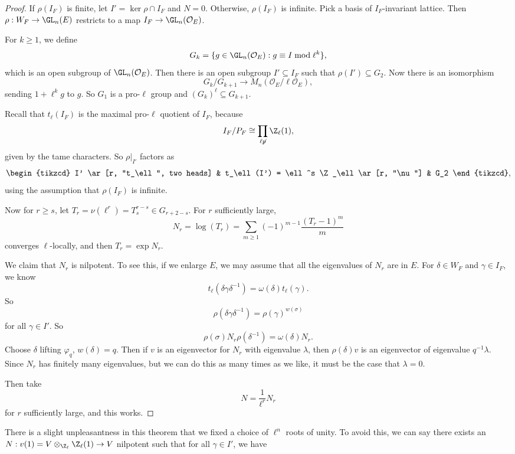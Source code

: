 \documentclass[a4paper]{article}
\begin{document}
\begin{proof}
  If $\rho(I_F)$ is finite, let $I' = \ker \rho \cap I_F$ and $N = 0$. Otherwise, $\rho(I_F)$ is infinite. Pick a basis of $I_F$-invariant lattice. Then $\rho: W_F \to \GL_n(E)$ restricts to a map $I_F \to \GL_n(\mathcal{O}_E)$.

  For $k \geq 1$, we define
  \[
    G_k = \{g \in \GL_n(\mathcal{O}_E)  : g \equiv I \bmod \ell^k \},
  \]
  which is an open subgroup of $\GL_n(\mathcal{O}_E)$. Then there is an open subgroup $I' \subseteq I_F$ such that $\rho(I') \subseteq G_2$. Now there is an isomorphism
  \[
    G_k/G_{k + 1} \to M_n(\mathcal{O}_E/\ell \mathcal{O}_E),
  \]
  sending $1 + \ell^k g$ to $g$. So $G_1$ is a pro-$\ell$ group and $(G_k)^\ell \subseteq G_{k + 1}$.

  Recall that $t_\ell(I_F)$ is the maximal pro-$\ell$ quotient of $I_F$, because
  \[
    I_F/P_F \cong \prod_{\ell \not p} \Z_\ell(1),
  \]
  given by the tame characters. So $\rho|_{I'}$ factors as
  \[
    \begin{tikzcd}
      I' \ar[r, "t_\ell", two heads] & t_\ell(I') = \ell^s \Z_\ell \ar[r, "\nu"] & G_2
    \end{tikzcd},
  \]
  using the assumption that $\rho(I_F)$ is infinite.

  Now for $r \geq s$, let $T_r = \nu(\ell^r) = T_s^{r - s} \in G_{r + 2  - s}$. For $r$ sufficiently large, 
  \[
    N_r = \log (T_r) = \sum_{m \geq 1} (-1)^{m - 1} \frac{(T_r - 1)^m}{m}
  \]
  converges $\ell$-locally, and then $T_r = \exp N_r$.

  We claim that $N_r$ is nilpotent. To see this, if we enlarge $E$, we may assume that all the eigenvalues of $N_r$ are in $E$. For $\delta \in W_F$ and $\gamma \in I_F$, we know
  \[
    t_\ell(\delta \gamma \delta^{-1}) = \omega(\delta) t_\ell(\gamma).
  \]
  So
  \[
    \rho(\delta \gamma \delta^{-1}) = \rho(\gamma)^{w(\sigma)}
  \]
  for all $\gamma \in I'$. So
  \[
    \rho(\sigma) N_r \rho(\delta^{-1}) = \omega(\delta) N_r.
  \]
  Choose $\delta$ lifting $\varphi_q$, $w(\delta) = q$. Then if $v$ is an eigenvector for $N_r$ with eigenvalue $\lambda$, then $\rho(\delta)v$ is an eigenvector of eigenvalue $q^{-1}\lambda$. Since $N_r$ has finitely many eigenvalues, but we can do this as many times as we like, it must be the case that $\lambda = 0$.

  Then take
  \[
    N = \frac{1}{\ell^r} N_r
  \]
  for $r$ sufficiently large, and this works.
\end{proof}
There is a slight unpleasantness in this theorem that we fixed a choice of $\ell^n$ roots of unity. To avoid this, we can say there exists an $N: v(1) = V \otimes_{\Z_\ell} \Z_{\ell}(1) \to V$ nilpotent such that for all $\gamma \in I'$, we have
\end{document}
